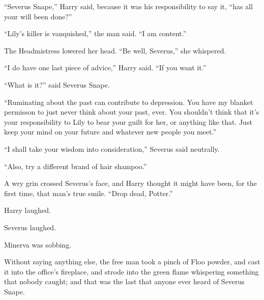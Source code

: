 “Severus Snape,” Harry said, because it was his responsibility to say it, “has all your will been done?”

“Lily’s killer is vanquished,” the man said. “I am content.”

The Headmistress lowered her head. “Be well, Severus,” she whispered.

“I do have one last piece of advice,” Harry said. “If you want it.”

“What is it?” said Severus Snape.

“Ruminating about the past can contribute to depression. You have my blanket permisson to just never think about your past, ever. You shouldn’t think that it’s your responsibility to Lily to bear your guilt for her, or anything like that. Just keep your mind on your future and whatever new people you meet.”

“I shall take your wisdom into consideration,” Severus said neutrally.

“Also, try a different brand of hair shampoo.”

A wry grin crossed Severus’s face, and Harry thought it might have been, for the first time, that man’s true smile. “Drop dead, Potter.”

Harry laughed.

Severus laughed.

Minerva was sobbing.

Without saying anything else, the free man took a pinch of Floo powder, and cast it into the office’s fireplace, and strode into the green flame whispering something that nobody caught; and that was the last that anyone ever heard of Severus Snape.
